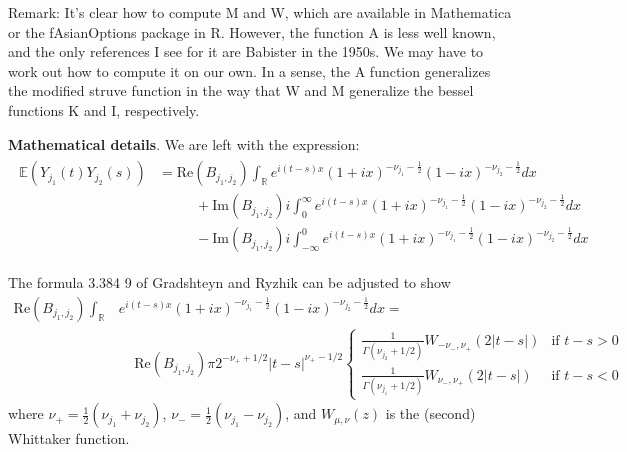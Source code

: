 \documentclass[11pt]{article}
\begin{document}





Remark: It's clear how to compute M and W, which are available in Mathematica or the fAsianOptions package in R. However, the function A is less well known, and the only references I see for it are Babister in the 1950s. We may have to work out how to compute it on our own. In a sense, the A function generalizes the modified struve function in the way that W and M generalize the bessel functions K and I, respectively.

\textbf{Mathematical details}. We are left with the expression: \begin{align}
\begin{split}
\mathbb{E}(Y_{j_1}(t)Y_{j_2}(s))
&=\textrm{Re}(B_{j_1, j_2}) \int_{\mathbb{R}} e^{i(t-s) x} (1 + i x)^{-\nu_{j_1}- \frac{1}{2}}(1 -i x)^{-\nu_{j_2}- \frac{1}{2}}dx\\
& \ \ \ \ \ \ \ \ \ \ \ \ + \textrm{Im}(B_{j_1, j_2})i\int_{0}^\infty e^{i(t-s) x} (1 + i x)^{-\nu_{j_1}- \frac{1}{2}}(1 -i x)^{-\nu_{j_2}- \frac{1}{2}}dx\\
& \ \ \ \ \ \ \ \ \ \ \ \ - \textrm{Im}(B_{j_1, j_2})i\int_{-\infty}^0 e^{i(t-s) x} (1 + i x)^{-\nu_{j_1}- \frac{1}{2}}(1 -i x)^{-\nu_{j_2}- \frac{1}{2}}dx
\end{split}\label{breakout}
\end{align}

The formula 3.384 9 of Gradshteyn and Ryzhik can be adjusted to show\begin{align*}
 \textrm{Re}(B_{j_1, j_2})\int_{\mathbb{R}}& e^{i(t-s) x} (1 + i x)^{-\nu_{j_1}- \frac{1}{2}}(1 -i x)^{-\nu_{j_2}- \frac{1}{2}}dx= \\
 & \ \ \ \ \ \textrm{Re}(B_{j_1, j_2})\pi 2^{-\nu_+ + 1/2} |t-s|^{\nu_+-  1/2}\begin{cases}
\frac{1}{\Gamma( \nu_{j_2}+ 1/2 )}W_{-\nu_-,\nu_+}(2|t-s|)&\textrm{if } t-s> 0\\
\frac{1}{\Gamma( \nu_{j_1}+ 1/2)}W_{\nu_-,\nu_+}(2|t-s|)&\textrm{if } t-s< 0
\end{cases}%
\end{align*}where $\nu_{+} = \frac{1}{2}\left(\nu_{j_1}+\nu_{j_2}\right)$, $\nu_- = \frac{1}{2}\left(\nu_{j_1}-\nu_{j_2}\right)$, and
$W_{\mu, \nu}(z)$ is the (second) Whittaker function.
\end{document}
